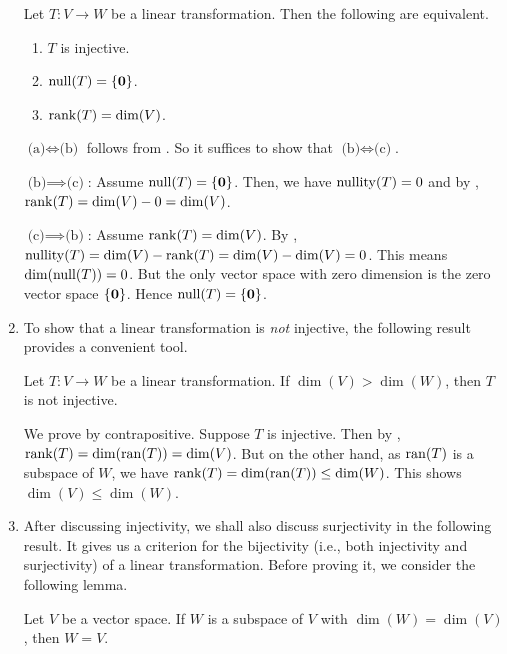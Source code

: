 \begin{enumerate}
\begin{theorem}
\label{thm:lin-tran-inj-crit}
Let \(T:V\to W\) be a linear transformation. Then the following are equivalent.
\begin{enumerate}
\item \(T\) is injective.
\item \(\operatorname{null}(T)=\{\vb*{0}\}\).
\item \(\operatorname{rank}(T)=\dim(V)\).
\end{enumerate}
\end{theorem}
\begin{pf}
\(\text{(a)}\iff \text{(b)}\) follows from
. So it suffices to show that
\(\text{(b)}\iff\text{(c)}\).

\underline{\(\text{(b)}\implies \text{(c)}\)}: Assume \(\operatorname{null}(T)=\{\vb*{0}\}\).
Then, we have \(\operatorname{nullity}(T)=0\) and by ,
\(\operatorname{rank}(T)=\dim(V)-0=\dim(V)\).

\underline{\(\text{(c)}\implies \text{(b)}\)}: Assume \(\operatorname{rank}(T)=\dim(V)\). By
, \(\operatorname{nullity}(T)=\dim(V)-\operatorname{rank}(T)=\dim(V)-\dim(V)=0\). This means
\(\dim(\operatorname{null}(T))=0\). But the only vector space with zero dimension is the zero
vector space \(\{\vb*{0}\}\). Hence \(\operatorname{null}(T)=\{\vb*{0}\}\).
\end{pf}
\item To show that a linear transformation is \emph{not} injective, the
following result provides a convenient tool.

\begin{proposition}
\label{prp:suff-not-inj}
Let \(T:V\to W\) be a linear transformation. If \(\dim(V)>\dim(W)\), then \(T\)
is not injective.
\end{proposition}
\begin{pf}
We prove by contrapositive. Suppose \(T\) is injective. Then by
, \(\operatorname{rank}(T)=\dim(\operatorname{ran}(T))=\dim(V)\). But on the
other hand, as \(\operatorname{ran}(T)\) is a subspace of \(W\), we have
\(\operatorname{rank}(T)=\dim(\operatorname{ran}(T))\le\dim(W)\). This shows \(\dim(V)\le\dim(W)\).
\end{pf}

\item After discussing injectivity, we shall also discuss surjectivity in the
following result. It gives us a criterion for the bijectivity (i.e., both
injectivity and surjectivity) of a linear transformation. Before proving it, we
consider the following lemma.

\begin{lemma}
\label{lma:subsp-same-dim-as-orig-equal-orig}
Let \(V\) be a vector space. If \(W\) is a subspace of \(V\) with
\(\dim(W)=\dim(V)\), then \(W=V\).
\end{lemma}


\end{enumerate}
